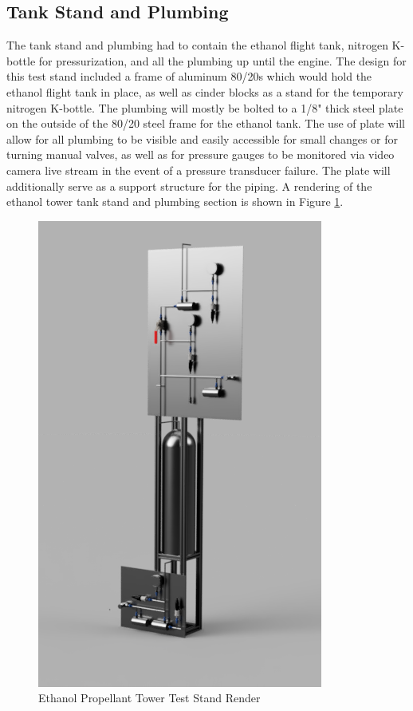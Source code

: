 \documentclass[9pt]{article} %
\numberwithin{equation}{section} %
\begin{document}
\subsection{Tank Stand and Plumbing}
\hspace{\parindent} The tank stand and plumbing had to contain the ethanol flight tank, nitrogen K-bottle for pressurization, and all the plumbing up until the engine. The design for this test stand included a frame of aluminum 80/20s which would hold the ethanol flight tank in place, as well as cinder blocks as a stand for the temporary nitrogen K-bottle. The plumbing will mostly be bolted to a 1/8" thick steel plate on the outside of the 80/20 steel frame for the ethanol tank. The use of plate will allow for all plumbing to be visible and easily accessible for small changes or for turning manual valves, as well as for pressure gauges to be monitored via video camera live stream in the event of a pressure transducer failure. The plate will additionally serve as a support structure for the piping. A rendering of the ethanol tower tank stand and plumbing section is shown in Figure \ref{fig:ethanol_tank_stand_render}.

\begin{figure}[!htb] 
    \centering
    \includegraphics[scale=0.5]{ethanol_stand.png} %
    \caption{Ethanol Propellant Tower Test Stand Render}
    \label{fig:ethanol_tank_stand_render}
\end{figure}
\end{document}
